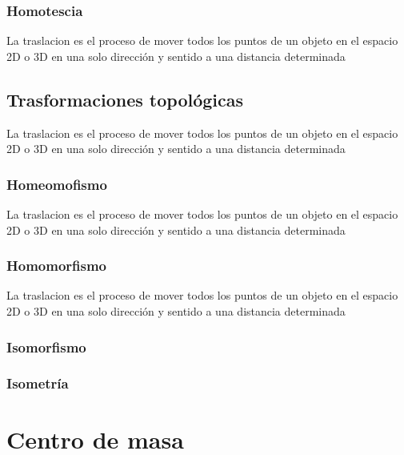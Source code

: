 \documentclass[
  16pt,
]{krantz}
\theoremstyle{definition}
\theoremstyle{definition}
\theoremstyle{definition}
\theoremstyle{definition}
\theoremstyle{remark}
\begin{document}
\hypertarget{homotescia}{%
\subsection{Homotescia}\label{homotescia}}

La traslacion es el proceso de mover todos los puntos de un objeto en el espacio 2D o 3D en una solo dirección y sentido a una distancia determinada

\hypertarget{trasformaciones-topoluxf3gicas}{%
\section{Trasformaciones topológicas}\label{trasformaciones-topoluxf3gicas}}

La traslacion es el proceso de mover todos los puntos de un objeto en el espacio 2D o 3D en una solo dirección y sentido a una distancia determinada

\hypertarget{homeomofismo}{%
\subsection{Homeomofismo}\label{homeomofismo}}

La traslacion es el proceso de mover todos los puntos de un objeto en el espacio 2D o 3D en una solo dirección y sentido a una distancia determinada

\hypertarget{homomorfismo}{%
\subsection{Homomorfismo}\label{homomorfismo}}

La traslacion es el proceso de mover todos los puntos de un objeto en el espacio 2D o 3D en una solo dirección y sentido a una distancia determinada \citep{xie2015}

\hypertarget{isomorfismo}{%
\subsection{Isomorfismo}\label{isomorfismo}}

\hypertarget{isometruxeda}{%
\subsection{Isometría}\label{isometruxeda}}

\hypertarget{centro-de-masa}{%
\chapter{Centro de masa}\label{centro-de-masa}}
\end{document}
